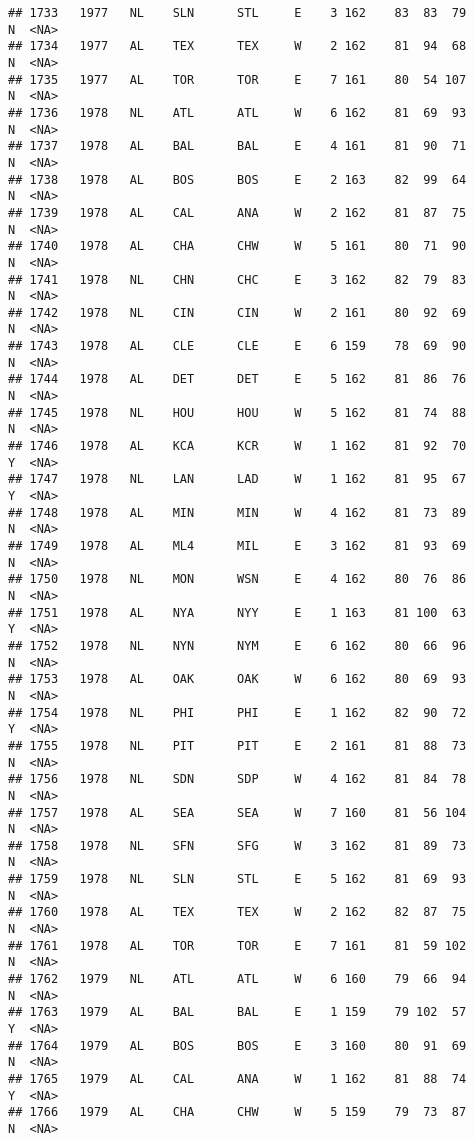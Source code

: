 \documentclass[]{article}
\begin{document}
\begin{verbatim}
## 1733   1977   NL    SLN      STL     E    3 162    83  83  79      N  <NA>
## 1734   1977   AL    TEX      TEX     W    2 162    81  94  68      N  <NA>
## 1735   1977   AL    TOR      TOR     E    7 161    80  54 107      N  <NA>
## 1736   1978   NL    ATL      ATL     W    6 162    81  69  93      N  <NA>
## 1737   1978   AL    BAL      BAL     E    4 161    81  90  71      N  <NA>
## 1738   1978   AL    BOS      BOS     E    2 163    82  99  64      N  <NA>
## 1739   1978   AL    CAL      ANA     W    2 162    81  87  75      N  <NA>
## 1740   1978   AL    CHA      CHW     W    5 161    80  71  90      N  <NA>
## 1741   1978   NL    CHN      CHC     E    3 162    82  79  83      N  <NA>
## 1742   1978   NL    CIN      CIN     W    2 161    80  92  69      N  <NA>
## 1743   1978   AL    CLE      CLE     E    6 159    78  69  90      N  <NA>
## 1744   1978   AL    DET      DET     E    5 162    81  86  76      N  <NA>
## 1745   1978   NL    HOU      HOU     W    5 162    81  74  88      N  <NA>
## 1746   1978   AL    KCA      KCR     W    1 162    81  92  70      Y  <NA>
## 1747   1978   NL    LAN      LAD     W    1 162    81  95  67      Y  <NA>
## 1748   1978   AL    MIN      MIN     W    4 162    81  73  89      N  <NA>
## 1749   1978   AL    ML4      MIL     E    3 162    81  93  69      N  <NA>
## 1750   1978   NL    MON      WSN     E    4 162    80  76  86      N  <NA>
## 1751   1978   AL    NYA      NYY     E    1 163    81 100  63      Y  <NA>
## 1752   1978   NL    NYN      NYM     E    6 162    80  66  96      N  <NA>
## 1753   1978   AL    OAK      OAK     W    6 162    80  69  93      N  <NA>
## 1754   1978   NL    PHI      PHI     E    1 162    82  90  72      Y  <NA>
## 1755   1978   NL    PIT      PIT     E    2 161    81  88  73      N  <NA>
## 1756   1978   NL    SDN      SDP     W    4 162    81  84  78      N  <NA>
## 1757   1978   AL    SEA      SEA     W    7 160    81  56 104      N  <NA>
## 1758   1978   NL    SFN      SFG     W    3 162    81  89  73      N  <NA>
## 1759   1978   NL    SLN      STL     E    5 162    81  69  93      N  <NA>
## 1760   1978   AL    TEX      TEX     W    2 162    82  87  75      N  <NA>
## 1761   1978   AL    TOR      TOR     E    7 161    81  59 102      N  <NA>
## 1762   1979   NL    ATL      ATL     W    6 160    79  66  94      N  <NA>
## 1763   1979   AL    BAL      BAL     E    1 159    79 102  57      Y  <NA>
## 1764   1979   AL    BOS      BOS     E    3 160    80  91  69      N  <NA>
## 1765   1979   AL    CAL      ANA     W    1 162    81  88  74      Y  <NA>
## 1766   1979   AL    CHA      CHW     W    5 159    79  73  87      N  <NA>

\end{verbatim}
\end{document}
